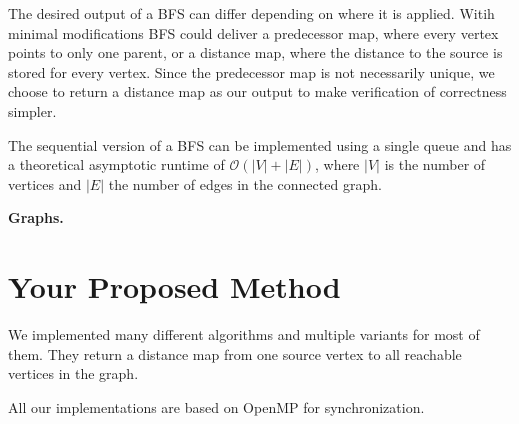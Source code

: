 \documentclass[letterpaper]{article}
\newcommand{\mypar}[1]{{\bf #1.}} %
\begin{document}
	The desired output of a BFS can differ depending on where it is applied. Witih minimal modifications BFS could deliver a predecessor map, where every vertex points to only one parent, or a distance map, where the distance to the source is stored for every vertex. Since the predecessor map is not necessarily unique, we choose to return a distance map as our output to make verification of correctness simpler.  
	
	The sequential version of a BFS can be implemented using a single queue and has a theoretical asymptotic runtime of $\mathcal{O}(\lvert V\rvert + \lvert E\rvert )$, where $\lvert V\rvert$ is the number of vertices and $\lvert E\rvert$ the number of edges in the connected graph.
	
	
	\mypar{Graphs}
	
	
	
	
	\section{Your Proposed Method}\label{sec:yourmethod}
	
	
	We implemented many different algorithms and multiple variants for most of them. They return a distance map from one source vertex to all reachable vertices in the graph.
	
	All our implementations are based on OpenMP for synchronization.
	
\end{document}
